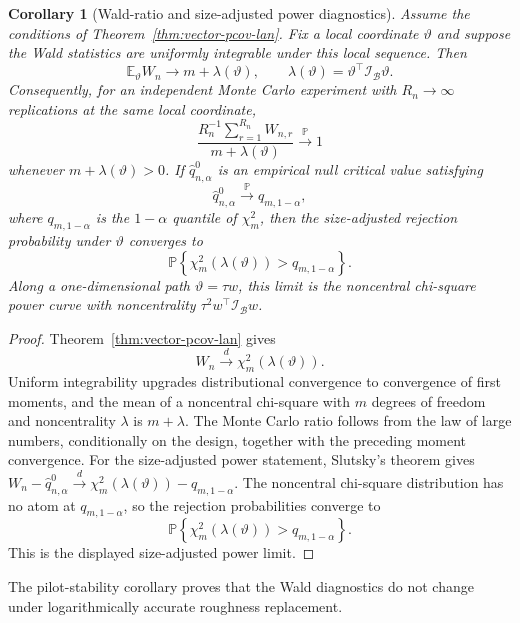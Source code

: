 \documentclass[11pt,a4paper]{amsart}
\theoremstyle{plain}
\newtheorem{corollary}[theorem]{Corollary}
\theoremstyle{definition}
\theoremstyle{remark}
\newcommand{\PP}{\mathbb{P}}
\newcommand{\EE}{\mathbb{E}}
\newcommand{\toP}{\xrightarrow{\PP}}
\newcommand{\toD}{\xrightarrow{d}}
\newcommand{\scrB}{\mathcal{B}}
\newcommand{\scrI}{\mathcal{I}}
\begin{document}
\begin{corollary}[Wald-ratio and size-adjusted power diagnostics]\label{cor:wald-ratio-diagnostic}
Assume the conditions of Theorem~\ref{thm:vector-pcov-lan}.  Fix a local coordinate
\(\vartheta\) and suppose the Wald statistics are uniformly integrable under this local sequence.
Then
\[
        \EE_{\vartheta}W_n
        \to
        m+\lambda(\vartheta),
        \qquad
        \lambda(\vartheta)=\vartheta^\top\scrI_{\scrB}\vartheta.
\]
Consequently, for an independent Monte Carlo experiment with \(R_n\to\infty\) replications at the
same local coordinate,
\[
        \frac{R_n^{-1}\sum_{r=1}^{R_n}W_{n,r}}
        {m+\lambda(\vartheta)}
        \toP 1
\]
whenever \(m+\lambda(\vartheta)>0\).  If \(\widehat q_{n,\alpha}^{0}\) is an empirical null
critical value satisfying
\[
        \widehat q_{n,\alpha}^{0}
        \toP
        q_{m,1-\alpha},
\]
where \(q_{m,1-\alpha}\) is the \(1-\alpha\) quantile of \(\chi_m^2\), then the size-adjusted
rejection probability under \(\vartheta\) converges to
\[
        \PP\left\{
        \chi_m^2(\lambda(\vartheta))>q_{m,1-\alpha}
        \right\}.
\]
Along a one-dimensional path \(\vartheta=\tau w\), this limit is the noncentral chi-square power
curve with noncentrality \(\tau^2 w^\top\scrI_{\scrB}w\).
\end{corollary}

\begin{proof}
Theorem~\ref{thm:vector-pcov-lan} gives
\[
        W_n\toD\chi_m^2(\lambda(\vartheta)).
\]
Uniform integrability upgrades distributional convergence to convergence of first moments, and the
mean of a noncentral chi-square with \(m\) degrees of freedom and noncentrality \(\lambda\) is
\(m+\lambda\).  The Monte Carlo ratio follows from the law of large numbers, conditionally on the
design, together with the preceding moment convergence.  For the size-adjusted power statement,
Slutsky's theorem gives
\(W_n-\widehat q_{n,\alpha}^{0}\toD
\chi_m^2(\lambda(\vartheta))-q_{m,1-\alpha}\).  The noncentral chi-square distribution has no atom
at \(q_{m,1-\alpha}\), so the rejection probabilities converge to
\[
        \PP\left\{
        \chi_m^2(\lambda(\vartheta))>q_{m,1-\alpha}
        \right\}.
\]
This is the displayed size-adjusted power limit.
\end{proof}

The pilot-stability corollary proves that the Wald diagnostics do not change under logarithmically
accurate roughness replacement.
\end{document}
